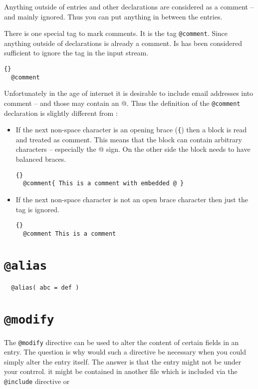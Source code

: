 Anything outside of entries and other declarations are considered as a
comment -- and mainly ignored. Thus you can put anything in between
the entries.

 There is one special tag to mark comments. It is the tag
\texttt{@comment}. Since anything outside of declarations is already a
comment. Is has been considered sufficient to ignore the tag in the
input stream.
\begin{lstlisting}{}
  @comment
\end{lstlisting}

Unfortunately in the age of internet it is desirable to include email
addresses into comment -- and those may contain an @. Thus the
definition of the \texttt{@comment} declaration is slightly different
from \BibTeX:
\begin{itemize}
\item If the next non-space character is an opening brace (\verb|{|)
  then a block is read and treated as comment. This means that the
  block can contain arbitrary characters -- especially the @ sign.
  On the other side the block needs to have balanced braces.
\begin{lstlisting}{}
  @comment{ This is a comment with embedded @ }
\end{lstlisting}
    
\item If the next non-space character is not an open brace character
  then just the tag is ignored.
\begin{lstlisting}{}
  @comment This is a comment
\end{lstlisting}
  
\end{itemize}


\section{\texttt{@alias}}

\begin{verbatim}
  @alias( abc = def )
\end{verbatim}

\INCOMPLETE

\section{\texttt{@modify}}
The \texttt{@modify} directive can be used to alter the content of
certain fields in an entry. The question is why would such a directive
be necessary when you could simply alter the entry itself. The answer
is that the entry might not be under your contrrol. it might be
contained in another file which is included via the \texttt{@include}
directive or

